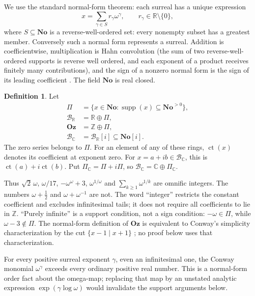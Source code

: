 \documentclass[11pt,oneside]{article}
\numberwithin{equation}{section}
\theoremstyle{definition}
\newtheorem{definition}[definition]{Definition}
\theoremstyle{remark}
\newcommand{\No}{\mathbf{No}}
\newcommand{\Oz}{\mathbf{Oz}}
\newcommand{\Z}{\mathbb Z}
\newcommand{\R}{\mathbb R}
\newcommand{\C}{\mathbb C}
\newcommand{\BR}{\mathcal B_{\R}}
\newcommand{\BC}{\mathcal B_{\C}}
\newcommand{\ct}{\operatorname{ct}}
\newcommand{\supp}{\operatorname{supp}}
\begin{document}
We use the standard normal-form theorem: each surreal has a unique
expression
\begin{equation}\label{odg:eq:nf}
 x=\sum_{\gamma\in S}r_\gamma\omega^\gamma,
 \qquad r_\gamma\in\R\setminus\{0\},
\end{equation}
where $S\subseteq\No$ is a reverse-well-ordered set: every nonempty subset
has a greatest member. Conversely such a normal form represents a surreal.
Addition is coefficientwise, multiplication is Hahn convolution (the sum of
two reverse-well-ordered supports is reverse well ordered, and each exponent
of a product receives finitely many contributions), and the sign of a
nonzero normal form is the sign of its leading coefficient
\cite{Conway,Gonshor}. The field $\No$ is real closed.

\begin{definition}\label{odg:def:rings}
Let
\begin{align*}
 \Pi&=\{x\in\No:\supp(x)\subseteq\No^{>0}\},\\
 \BR&=\R\oplus\Pi,\\
 \Oz&=\Z\oplus\Pi,\\
 \BC&=\BR[i]\subseteq\No[i].
\end{align*}
The zero series belongs to $\Pi$. For an element of any of these rings,
$\ct(x)$ denotes its coefficient at exponent zero. For
$x=a+ib\in\BC$, this is $\ct(a)+i\ct(b)$. Put $\Pi_{\C}=\Pi+i\Pi$, so
$\BC=\C\oplus\Pi_{\C}$.
\end{definition}

Thus $\sqrt2\,\omega$, $\omega/17$, $-\omega^\omega+3$,
$\omega^{1/\omega}$ and $\sum_{k\geq1}\omega^{1/k}$ are omnific integers.
The numbers $\omega+\tfrac12$ and $\omega+\omega^{-1}$ are not. The word
``integer'' restricts the constant coefficient and excludes infinitesimal
tails; it does not require all coefficients to lie in $\Z$.
``Purely infinite'' is a support condition, not a sign condition: $-\omega\in\Pi$,
while $\omega-3\notin\Pi$. The normal-form definition of $\Oz$ is equivalent to
Conway's simplicity characterization by the cut $\{x-1\mid x+1\}$
\cite{Conway,Gonshor}; no proof below uses that characterization.

For every positive surreal exponent $\gamma$, even an infinitesimal one,
the Conway monomial $\omega^\gamma$ exceeds every ordinary positive
real number. This is a normal-form order fact about the omega-map;
replacing that map by an unstated analytic expression
$\exp(\gamma\log\omega)$ would invalidate the support arguments below.
\end{document}
